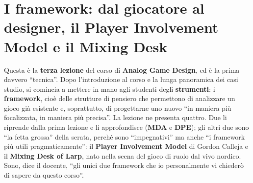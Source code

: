%
%
%    
%    
%    
%

\chapter[I framework del game design]{I framework: dal giocatore al designer,
il Player Involvement Model e il Mixing Desk}
\label{a3:cap:framework}

Questa è la \textbf{terza lezione} del corso di \textbf{Analog Game Design}, ed è
la prima davvero ``tecnica''. Dopo l'introduzione al corso e la lunga panoramica
dei casi studio, si comincia a mettere in mano agli studenti degli
\textbf{strumenti}: i \textbf{framework}, cioè delle strutture di pensiero che
permettono di analizzare un gioco già esistente e, soprattutto, di progettarne
uno nuovo ``in maniera più focalizzata, in maniera più precisa''. La lezione ne
presenta quattro. Due li riprende dalla prima lezione e li approfondisce
(\textbf{MDA} e \textbf{DPE}); gli altri due sono ``la fetta grossa'' della
serata, perché sono ``impegnativi'' ma anche ``i framework più utili
pragmaticamente'': il \textbf{Player Involvement Model} di Gordon Calleja e il
\textbf{Mixing Desk of Larp}, nato nella scena del gioco di ruolo dal vivo
nordico. Sono, dice il docente, ``gli unici due framework che io personalmente vi
chiederò di sapere da questo corso''.

